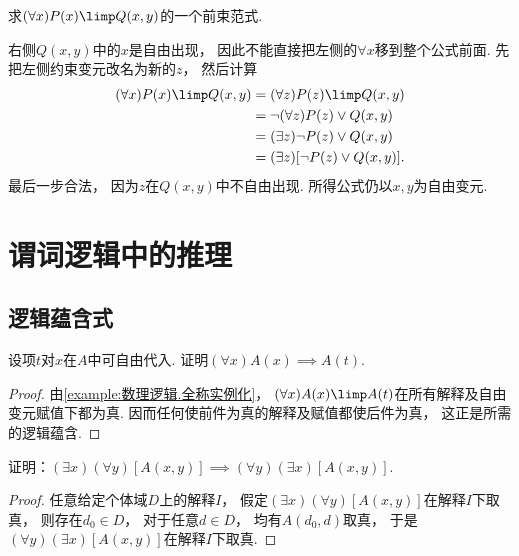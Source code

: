 \begin{example}
    求\((\forall x)P(x)\limp Q(x,y)\)的一个前束范式.
    \begin{solution}
        右侧\(Q(x,y)\)中的\(x\)是自由出现，
        因此不能直接把左侧的\(\forall x\)移到整个公式前面.
        先把左侧约束变元改名为新的\(z\)，
        然后计算
        \begin{align*}
            (\forall x)P(x)\limp Q(x,y) &= (\forall z)P(z)\limp Q(x,y) \\
            &= \neg(\forall z)P(z)\lor Q(x,y) \\
            &= (\exists z)\neg P(z)\lor Q(x,y) \\
            &= (\exists z)[\neg P(z)\lor Q(x,y)].
        \end{align*}
        最后一步合法，
        因为\(z\)在\(Q(x,y)\)中不自由出现.
        所得公式仍以\(x,y\)为自由变元.
    \end{solution}
\end{example}

\section{谓词逻辑中的推理}
\subsection{逻辑蕴含式}
\begin{example}
    设项\(t\)对\(x\)在\(A\)中可自由代入.
    证明\((\forall x)A(x)\implies A(t)\).
    \begin{proof}
        由\cref{example:数理逻辑.全称实例化}，
        \((\forall x)A(x)\limp A(t)\)在所有解释及自由变元赋值下都为真.
        因而任何使前件为真的解释及赋值都使后件为真，
        这正是所需的逻辑蕴含.
    \end{proof}
\end{example}

\begin{example}
证明：\((\exists x)(\forall y)[A(x,y)] \implies (\forall y)(\exists x)[A(x,y)]\).
\begin{proof}
任意给定个体域\(D\)上的解释\(I\)，
假定\((\exists x)(\forall y)[A(x,y)]\)在解释\(I\)下取真，
则存在\(d_0 \in D\)，
对于任意\(d \in D\)，
均有\(A(d_0,d)\)取真，
于是\((\forall y)(\exists x)[A(x,y)]\)在解释\(I\)下取真.
\end{proof}
\end{example}

